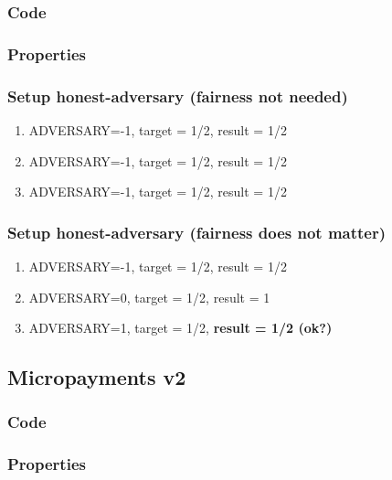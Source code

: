 \documentclass{article}
\begin{document}
\subsubsection{Code}



\subsubsection{Properties}



\subsubsection{Setup honest-adversary (fairness not needed)}

\begin{enumerate}
\item ADVERSARY=-1, target = 1/2, result = 1/2
\item ADVERSARY=-1, target = 1/2, result = 1/2
\item ADVERSARY=-1, target = 1/2, result = 1/2
\end{enumerate}

\subsubsection{Setup honest-adversary (fairness does not matter)}

\begin{enumerate}
\item ADVERSARY=-1, target = 1/2, result = 1/2
\item ADVERSARY=0, target = 1/2, result = 1
\item ADVERSARY=1, target = 1/2, \textbf{result = 1/2 (ok?)}
\end{enumerate}

\subsection{Micropayments v2}

\subsubsection{Code}



\subsubsection{Properties}
\end{document}

